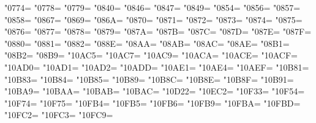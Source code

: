\XeTeXcharclass"0774=\KclassArabR
\XeTeXcharclass"0778=\KclassArabR
\XeTeXcharclass"0779=\KclassArabR
\XeTeXcharclass"0840=\KclassArabR
\XeTeXcharclass"0846=\KclassArabR
\XeTeXcharclass"0847=\KclassArabR
\XeTeXcharclass"0849=\KclassArabR
\XeTeXcharclass"0854=\KclassArabR
\XeTeXcharclass"0856=\KclassArabR
\XeTeXcharclass"0857=\KclassArabR
\XeTeXcharclass"0858=\KclassArabR
\XeTeXcharclass"0867=\KclassArabR
\XeTeXcharclass"0869=\KclassArabR
\XeTeXcharclass"086A=\KclassArabR
\XeTeXcharclass"0870=\KclassArabR
\XeTeXcharclass"0871=\KclassArabR
\XeTeXcharclass"0872=\KclassArabR
\XeTeXcharclass"0873=\KclassArabR
\XeTeXcharclass"0874=\KclassArabR
\XeTeXcharclass"0875=\KclassArabR
\XeTeXcharclass"0876=\KclassArabR
\XeTeXcharclass"0877=\KclassArabR
\XeTeXcharclass"0878=\KclassArabR
\XeTeXcharclass"0879=\KclassArabR
\XeTeXcharclass"087A=\KclassArabR
\XeTeXcharclass"087B=\KclassArabR
\XeTeXcharclass"087C=\KclassArabR
\XeTeXcharclass"087D=\KclassArabR
\XeTeXcharclass"087E=\KclassArabR
\XeTeXcharclass"087F=\KclassArabR
\XeTeXcharclass"0880=\KclassArabR
\XeTeXcharclass"0881=\KclassArabR
\XeTeXcharclass"0882=\KclassArabR
\XeTeXcharclass"088E=\KclassArabR
\XeTeXcharclass"08AA=\KclassArabR
\XeTeXcharclass"08AB=\KclassArabR
\XeTeXcharclass"08AC=\KclassArabR
\XeTeXcharclass"08AE=\KclassArabR
\XeTeXcharclass"08B1=\KclassArabR
\XeTeXcharclass"08B2=\KclassArabR
\XeTeXcharclass"08B9=\KclassArabR
\XeTeXcharclass"10AC5=\KclassArabR
\XeTeXcharclass"10AC7=\KclassArabR
\XeTeXcharclass"10AC9=\KclassArabR
\XeTeXcharclass"10ACA=\KclassArabR
\XeTeXcharclass"10ACE=\KclassArabR
\XeTeXcharclass"10ACF=\KclassArabR
\XeTeXcharclass"10AD0=\KclassArabR
\XeTeXcharclass"10AD1=\KclassArabR
\XeTeXcharclass"10AD2=\KclassArabR
\XeTeXcharclass"10ADD=\KclassArabR
\XeTeXcharclass"10AE1=\KclassArabR
\XeTeXcharclass"10AE4=\KclassArabR
\XeTeXcharclass"10AEF=\KclassArabR
\XeTeXcharclass"10B81=\KclassArabR
\XeTeXcharclass"10B83=\KclassArabR
\XeTeXcharclass"10B84=\KclassArabR
\XeTeXcharclass"10B85=\KclassArabR
\XeTeXcharclass"10B89=\KclassArabR
\XeTeXcharclass"10B8C=\KclassArabR
\XeTeXcharclass"10B8E=\KclassArabR
\XeTeXcharclass"10B8F=\KclassArabR
\XeTeXcharclass"10B91=\KclassArabR
\XeTeXcharclass"10BA9=\KclassArabR
\XeTeXcharclass"10BAA=\KclassArabR
\XeTeXcharclass"10BAB=\KclassArabR
\XeTeXcharclass"10BAC=\KclassArabR
\XeTeXcharclass"10D22=\KclassArabR
\XeTeXcharclass"10EC2=\KclassArabR
\XeTeXcharclass"10F33=\KclassArabR
\XeTeXcharclass"10F54=\KclassArabR
\XeTeXcharclass"10F74=\KclassArabR
\XeTeXcharclass"10F75=\KclassArabR
\XeTeXcharclass"10FB4=\KclassArabR
\XeTeXcharclass"10FB5=\KclassArabR
\XeTeXcharclass"10FB6=\KclassArabR
\XeTeXcharclass"10FB9=\KclassArabR
\XeTeXcharclass"10FBA=\KclassArabR
\XeTeXcharclass"10FBD=\KclassArabR
\XeTeXcharclass"10FC2=\KclassArabR
\XeTeXcharclass"10FC3=\KclassArabR
\XeTeXcharclass"10FC9=\KclassArabR

